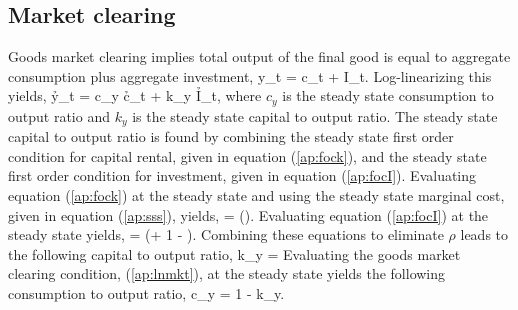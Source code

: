 \subsection{Market clearing}
Goods market clearing implies total output of the final good is equal to aggregate consumption plus aggregate investment,
\bdm y_t = c_t + I_t. \edm
Log-linearizing this yields,
\beq \label{ap:lnmkt} \h{y}_t = c_y \h{c}_t + \delta k_y \h{I}_t, \eeq
where $c_y$ is the steady state consumption to output ratio and $k_y$ is the steady state capital to output ratio.  The steady state capital to output ratio is found by combining the steady state first order condition for capital rental, given in equation (\ref{ap:fock}), and the steady state  first order condition for investment, given in equation (\ref{ap:focI}).  Evaluating equation (\ref{ap:fock}) at the steady state and using the steady state marginal cost, given in equation (\ref{ap:sss}), yields,
\bdm \rho = \alpha {} \left(\right). \edm
Evaluating equation (\ref{ap:focI}) at the steady state yields,
 = \beta \left(\rho + 1 - \delta \right). \edm
Combining these equations to eliminate $\rho$ leads to the following capital to output ratio,
\beq k_y =  \eeq
Evaluating the goods market clearing condition, (\ref{ap:lnmkt}), at the steady state yields the following consumption to output ratio,
\beq c_y = 1 - \delta k_y. \eeq

